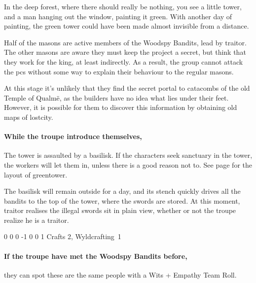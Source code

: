 \begin{boxtext}

  In the deep forest, where there should really be nothing, you see a little tower, and a man hanging out the window, painting it green.
  With another day of painting, the green tower could have been made almost invisible from a distance.

\end{boxtext}

Half of the masons are active members of the Woodspy Bandits, lead by \gls{traitor}.
The other masons are aware they must keep the project a secret, but think that they work for the king, at least indirectly.
As a result, the group cannot attack the \glspl{pc} without some way to explain their behaviour to the regular masons.

At this stage it's unlikely that they find the secret portal to catacombs of the old Temple of Qualm\"{e}, as the builders have no idea what lies under their feet.
However, it is possible for them to discover this information by obtaining old maps of \gls{lostcity}.

\paragraph{While the troupe introduce themselves,}
The tower is assaulted by a basilisk.
If the characters seek sanctuary in the tower, the workers will let them in, unless there is a good reason not to.
See page \pageref{green_tower} for the layout of \gls{greentower}.

The basilisk will remain outside for a day, and its stench quickly drives all the bandits to the top of the tower, where the swords are stored.
At this moment, \gls{traitor} realises the illegal swords sit in plain view, whether or not the troupe realize he is a traitor.

\label{traitor}
\traitor

{0}%
{0}%
{{0}%
{-1}%
{0}}%
{0}%
{1}%
{Crafts 2, Wyldcrafting~1}%
{\shortsword}%
{}

\basilisk

\paragraph{If the troupe have met the Woodspy Bandits before,}
they can spot these are the same people with a Wits + Empathy Team Roll.%

